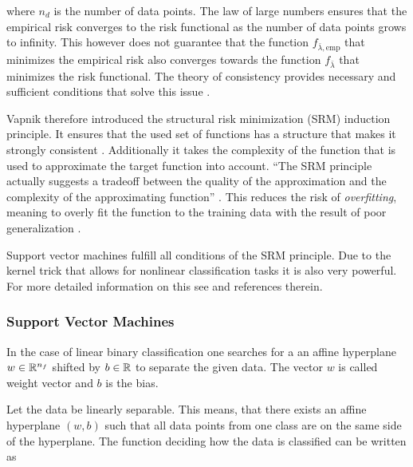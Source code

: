 where \(n_d\) is the number of data points.
The law of large numbers ensures that the empirical risk converges to the risk functional as the number of data points grows to infinity. This however does not guarantee that the function \(f_{\bar{\lambda},\text{emp}}\) that minimizes the empirical risk also converges towards the function \(f_{\bar{\lambda}}\) that minimizes the risk functional.
The theory of consistency provides necessary and sufficient conditions that solve this issue  \cite[p. 989]{Vapnik1999}.

Vapnik therefore introduced the structural risk minimization (SRM) induction principle. It ensures that the used set of functions has a structure that makes it strongly consistent \cite{Vapnik1999}. Additionally it takes the complexity of the function that is used to approximate the target function into account. ``The SRM principle actually suggests a tradeoff between the quality of the approximation and the complexity of the approximating function'' \cite[p. 994]{Vapnik1999}.
This reduces the risk of \emph{overfitting}, meaning to overly fit the function to the training data with the result of poor generalization \cite[chapter 1.3]{Cristianini2000}.


Support vector machines fulfill all conditions of the SRM principle. Due to the kernel trick that allows for nonlinear classification tasks it is also very powerful. For more detailed information on this see \cite{Kunapuli2008} and references therein.

\subsubsection{Support Vector Machines}
\label{sec_SVMs}

In the case of linear binary classification one searches for a an affine hyperplane \(w \in \mathbb{R}^{n_f}\) shifted by \(b \in \mathbb{R}\) to separate the given data. The vector \(w\) is called weight vector and \(b\) is the bias.

Let the data be linearly separable. This means, that there exists an affine hyperplane \((w,b)\) such that all data points from one class are on the same side of the hyperplane. The function deciding how the data is classified can be written as

